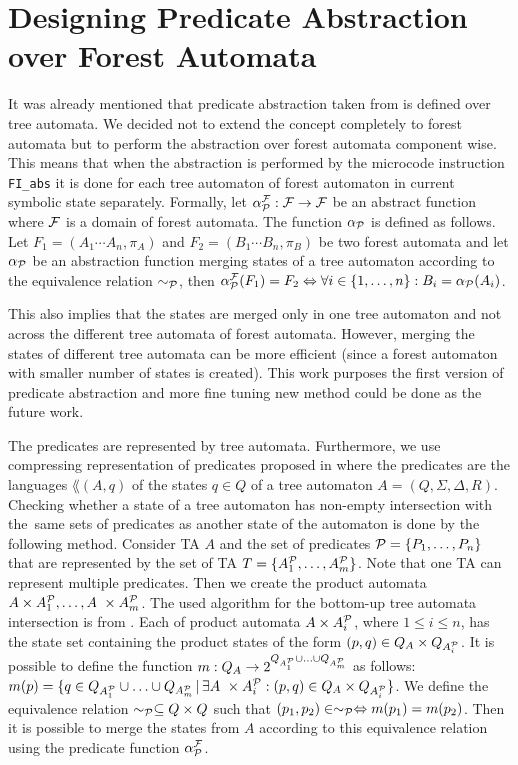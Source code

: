 \section{Designing Predicate Abstraction over Forest Automata}
\label{sec:padesign}

It was already mentioned that predicate abstraction taken from \cite{artmc}
is defined over tree automata.
We decided not to extend the concept completely to forest automata but
to perform the abstraction over forest automata component wise.
This means that when the abstraction is performed by the microcode instruction
{\tt FI\_abs} it is done for each tree automaton of forest automaton in current symbolic
state separately.
Formally, let $\alpha_{\mathcal{P}}^{\mathcal{F}}: \mathcal{F} \rightarrow \mathcal{F}$ be an abstract function where
$\mathcal{F}$ is a domain of forest automata.
The function $\alpha_{\mathcal{P}}$ is defined as follows.
Let $F_1=(A_1 \cdots A_n, \pi_A)$ and $F_2=(B_1 \cdots B_n, \pi_B)$ be two forest automata
and let $\alpha_{\mathcal{P}}$ be an abstraction function merging states of a tree automaton according
to the equivalence relation $\sim_{\mathcal{P}}$,
then $\alpha_{\mathcal{P}}^{\mathcal{F}}(F_1) = F_2 \Leftrightarrow \forall i \in \{1,\ldots,n\}: B_i = \alpha_{\mathcal{P}}(A_i)$.

This also implies that the states are merged only in one tree automaton and not across the different
tree automata of forest automata.
However, merging the states of different tree automata can be more efficient (since
a forest automaton with smaller number of states is created).
This work purposes the first version of predicate abstraction and more
fine tuning new method could be done as the future work.

The predicates are represented by tree automata.
Furthermore, we use compressing representation of predicates
proposed in \cite{artmc} where the predicates are the languages $\lang(A,q)$
of the states $q \in Q$ of a tree automaton $A=(Q,\Sigma,\Delta, R)$.
Checking whether a state of a tree automaton has non-empty intersection
with the~same sets of predicates as another state of the automaton is done by the following method.
Consider TA $A$ and the set of predicates $\mathcal{P} = \{P_1, \ldots, P_n\}$
that are represented by the set of TA $T=\{A^\mathcal{P}_{1}, \ldots, A^\mathcal{P}_{m}\}$.
Note that one TA can represent multiple predicates.
Then we create the product automata $A \times A^\mathcal{P}_{1}, \ldots, A~\times A^\mathcal{P}_{m}$.
The used algorithm for the bottom-up tree automata intersection is from \cite{mt:lengal}.
Each of product automata $A \times A^\mathcal{P}_{i}$, where $1 \leq i \leq n$, has the state set
containing the product states of the form $(p,q) \in Q_A \times Q_{A^\mathcal{P}_{i}}$.
It is possible to define the function $m: Q_A \rightarrow 2^{Q_{A^\mathcal{P}_{1}} \cup \ldots
\cup Q_{A^\mathcal{P}_{m}}}$ as follows: $m(p) = \{q \in Q_{A^\mathcal{P}_{1}} \cup \ldots \cup Q_{A^\mathcal{P}_{m}}\,|\,
\exists A~\times A^\mathcal{P}_{i}: (p,q) \in Q_{A} \times Q_{A^\mathcal{P}_{i}}\}$.
We define the equivalence relation $\sim_{\mathcal{P}} \subseteq Q \times Q$
such that $(p_1,p_2) \in \sim_{\mathcal{P}} \Leftrightarrow m(p_1) = m(p_2)$.
Then it is possible to merge the states from $A$ according to this equivalence relation
using the predicate function $\alpha_{\mathcal{P}}^{\mathcal{F}}$.

